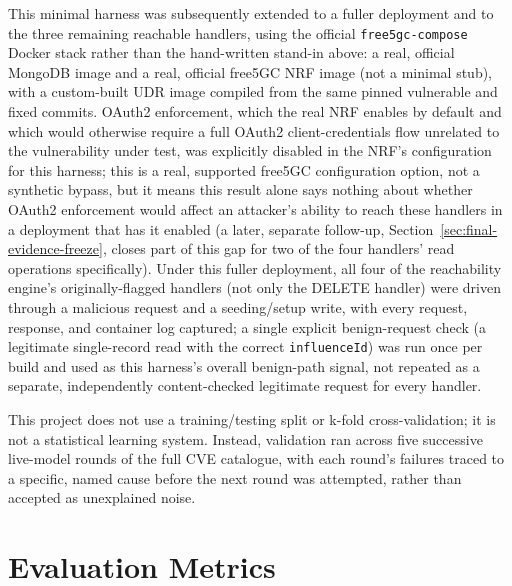 \documentclass[12pt,a4paper]{report}
\begin{document}
This minimal harness was subsequently extended to a fuller deployment and to the three remaining reachable handlers, using the official \texttt{free5gc-compose} Docker stack rather than the hand-written stand-in above: a real, official MongoDB image and a real, official free5GC NRF image (not a minimal stub), with a custom-built UDR image compiled from the same pinned vulnerable and fixed commits. OAuth2 enforcement, which the real NRF enables by default and which would otherwise require a full OAuth2 client-credentials flow unrelated to the vulnerability under test, was explicitly disabled in the NRF's configuration for this harness; this is a real, supported free5GC configuration option, not a synthetic bypass, but it means this result alone says nothing about whether OAuth2 enforcement would affect an attacker's ability to reach these handlers in a deployment that has it enabled (a later, separate follow-up, Section~\ref{sec:final-evidence-freeze}, closes part of this gap for two of the four handlers' read operations specifically). Under this fuller deployment, all four of the reachability engine's originally-flagged handlers (not only the DELETE handler) were driven through a malicious request and a seeding/setup write, with every request, response, and container log captured; a single explicit benign-request check (a legitimate single-record read with the correct \texttt{influenceId}) was run once per build and used as this harness's overall benign-path signal, not repeated as a separate, independently content-checked legitimate request for every handler.

This project does not use a training/testing split or k-fold cross-validation; it is not a statistical learning system. Instead, validation ran across five successive live-model rounds of the full CVE catalogue, with each round's failures traced to a specific, named cause before the next round was attempted, rather than accepted as unexplained noise.

\section{Evaluation Metrics}
\label{sec:evaluation-metrics}
\end{document}
